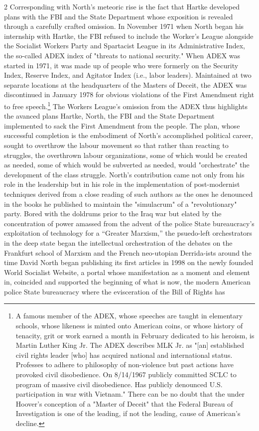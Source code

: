 \documentclass[10pt,a4paper,twoside]{article} %
\begin{document}
\begin{multicols}{2}
{\newline \indent Corresponding with North's meteoric rise is the fact that Hartke developed plans with the FBI and the State Department whose exposition is revealed through a carefully crafted omission. In November 1971 when North began his internship with Hartke, the FBI refused to include the Worker's League alongside the Socialist Workers Party and Spartacist League in its Administrative Index, the so-called ADEX index of "threats to national security." When ADEX was started in 1971, it was made up of people who were formerly on the Security Index, Reserve Index, and Agitator Index (i.e., labor leaders). Maintained at two separate locations at the headquarters of the Masters of Deceit, the ADEX was discontinued in January 1978 for obvious violations of the First Amendment right to free speech.\footnote{A famous member of the ADEX, whose speeches are taught in elementary schools, whose likeness is minted onto American coins, or whose history of tenacity, grit or work earned a month in February dedicated to his heroism, is Martin Luther King Jr. The ADEX describes MLK Jr. as "[an] established civil rights leader [who] has acquired national and international status. Professes to adhere to philosophy of non-violence but past actions have provoked civil disobedience. On 8/14/1967 publicly committed SCLC to program of massive civil disobedience. Has publicly denounced U.S. participation in war with Vietnam." There can be no doubt that the under Hoover's conception of a "Master of Deceit" that the Federal Bureau of Investigation is one of the leading, if not the leading, cause of American's decline.} The Workers League's omission from the ADEX thus highlights the avanced plans Hartke, North, the FBI and the State Department implemented to sack the First Amendment from the people. \newline \indent The plan, whose successful completion is the embodiment of North's accomplished political career, sought to overthrow the labour movement so that rather than reacting to struggles, the overthrown labour organizations, some of which would be created as needed, some of which would be subverted as needed, would "orchestrate" the development of the class struggle. North's contribution came not only from his role in the leadership but in his role in the implementation of post-modernist techniques derived from a close reading of such authors as the ones he denounced in the books he published to maintain the "simulacrum" of a "revolutionary" party. \newline \indent Bored with the doldrums prior to the Iraq war but elated by the concentration of power amassed from the advent of the police State bureaucracy’s exploitation of technology for a “Greater Marxism,” the psuedo-left orchestrators in the deep state began the intellectual orchestration of the debates on the Frankfurt school of Marxism and the French neo-utopian Derrida-ists around the time David North began publishing its first articles in 1998 on the newly founded World Socialist Website, a portal whose manifestation as a moment and element in, coincided and supported the beginning of what is now, the modern American police State bureaucracy where the evisceration of the Bill of Rights has }
\end{multicols}
\end{document}
